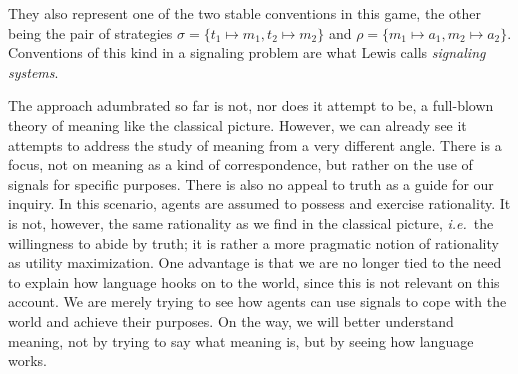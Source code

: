 \documentclass[a4paper]{article}
\begin{document}
They also represent one of the two stable conventions in this game, the other being the pair of strategies $\sigma = \lbrace t_1 \mapsto m_1, t_2 \mapsto m_2 \rbrace$ and $\rho = \lbrace m_1 \mapsto a_1, m_2 \mapsto a_2 \rbrace$.
Conventions of this kind in a signaling problem are what Lewis calls \emph{signaling systems}.

The approach adumbrated so far is not, nor does it attempt to be, a full-blown theory of meaning like the classical picture.
However, we can already see it attempts to address the study of meaning from a very different angle.
There is a focus, not on meaning as a kind of correspondence, but rather on the use of signals for specific purposes.
There is also no appeal to truth as a guide for our inquiry.
In this scenario, agents are assumed to possess and exercise rationality.
It is not, however, the same rationality as we find in the classical picture, \emph{i.e.}~the willingness to abide by truth; it is rather a more pragmatic notion of rationality as utility maximization.
One advantage is that we are no longer tied to the need to explain how language hooks on to the world, since this is not relevant on this account.
We are merely trying to see how agents can use signals to cope with the world and achieve their purposes.
On the way, we will better understand meaning, not by trying to say what meaning is, but by seeing how language works.
\end{document}

